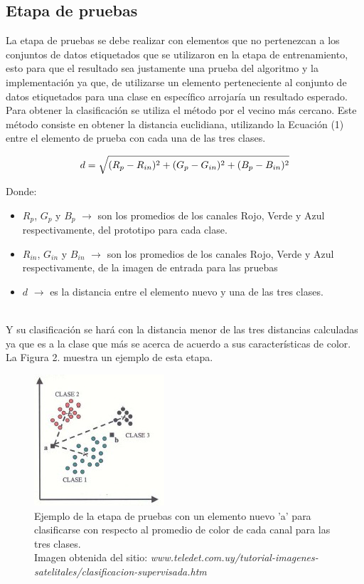 \documentclass[conference]{IEEEtran}
\begin{document}
\newpage
\subsection{Etapa de pruebas}
La etapa de pruebas se debe realizar con elementos que no pertenezcan a los conjuntos de datos etiquetados que se utilizaron en la etapa de entrenamiento, esto para que el resultado sea justamente una prueba del algoritmo y la implementaci\'on ya que, de utilizarse un elemento perteneciente al conjunto de datos etiquetados para una clase en espec\'ifico arrojar\'ia un resultado esperado.\\
Para obtener la clasificaci\'on se utiliza el m\'etodo por el vecino m\'as cercano. Este m\'etodo consiste en obtener la distancia euclidiana, utilizando la Ecuaci\'on (1) entre el elemento de prueba con cada una de las tres clases.

\begin{equation}
	d = \sqrt{ (R_p - R_{in} )^2 + (G_p - G_{in})^2 + (B_p - B_{in})^2 } \\
\end{equation}

Donde:\\
\begin{itemize}
	\item $R_p$, $G_p$ y $B_p$ $\rightarrow$ son los promedios de los canales Rojo, Verde y Azul respectivamente, del prototipo para cada clase.
	\item $R_{in}$, $G_{in}$ y $B_{in}$ $\rightarrow$ son los promedios de los canales Rojo, Verde y Azul respectivamente, de la imagen de entrada para las pruebas
	\item $d$ $\rightarrow$ es la distancia entre el elemento nuevo y una de las tres clases.\\\\
\end{itemize}

Y su clasificaci\'on se har\'a con la distancia menor de las tres distancias calculadas ya que es a la clase que m\'as se acerca de acuerdo a sus caracter\'isticas de color. La Figura 2. muestra un ejemplo de esta etapa.

\begin{figure}[h]
	\setlength{\unitlength}{0.0105in}
	\centering
	\includegraphics[scale=0.85]{./images/clasificacion_supervisada.jpg}
	\caption{Ejemplo de la etapa de pruebas con un elemento nuevo 'a' para clasificarse con respecto al promedio de color de cada canal para las tres clases.\\ Imagen obtenida del sitio: \emph{ www.teledet.com.uy/tutorial-imagenes-satelitales/clasificacion-supervisada.htm}}
\end{figure}
\end{document}
